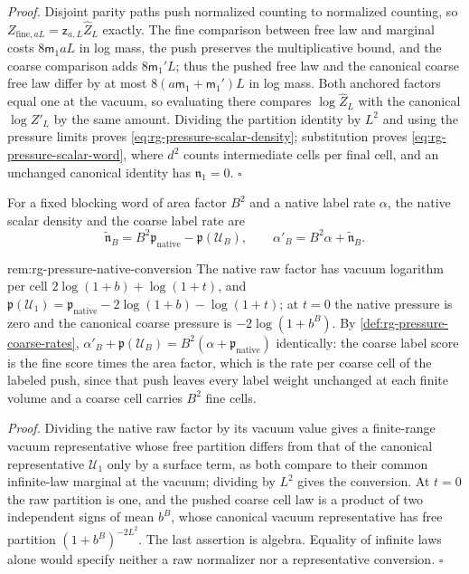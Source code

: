 \noindent\emph{Proof.}
Disjoint parity paths push normalized counting to normalized counting, so
$Z_{\mathrm{fine},aL}=\mathsf z_{a,L}\widehat Z_L$ exactly. The fine
comparison between free law and marginal costs $8\mathsf m_1aL$ in log mass,
the push preserves the multiplicative bound, and the coarse comparison adds
$8\mathsf m_1'L$; thus the pushed free law and the canonical coarse free law
differ by at most $8(a\mathsf m_1+\mathsf m_1')L$ in log mass. Both anchored
factors equal one at the vacuum, so evaluating there compares
$\log\widehat Z_L$ with the canonical $\log Z'_L$ by the same amount.
Dividing the partition identity by $L^2$ and using the pressure limits proves
\cref{eq:rg-pressure-scalar-density}; substitution proves
\cref{eq:rg-pressure-scalar-word}, where $d^2$ counts intermediate cells per
final cell, and an unchanged canonical identity has $\mathfrak n_1=0$. $\square$

For a fixed blocking word of area factor $B^2$ and a native label rate
$\alpha$, the native scalar density and the coarse label rate are
\begin{equation}
 \widetilde{\mathfrak n}_B=B^2\mathfrak p_{\mathrm{native}}
                            -\mathfrak p(\mathscr U_B),\qquad
 \alpha'_B=B^2\alpha+\widetilde{\mathfrak n}_B.
 \label{eq:rg-pressure-native-scalar}
\end{equation}

{rem:rg-pressure-native-conversion}
The native raw factor has vacuum logarithm per cell
$2\log(1+b)+\log(1+t)$, and
$\mathfrak p(\mathscr U_1)=\mathfrak p_{\mathrm{native}}-2\log(1+b)-\log(1+t)$; at
$t=0$ the native pressure is zero and the canonical coarse pressure is
$-2\log(1+b^B)$. By \cref{def:rg-pressure-coarse-rates},
$\alpha'_B+\mathfrak p(\mathscr U_B)=B^2(\alpha+\mathfrak p_{\mathrm{native}})$
identically: the coarse label score is the fine score times the area factor,
which is the rate per coarse cell of the labeled push, since that push leaves
every label weight unchanged at each finite volume and a coarse cell carries
$B^2$ fine cells. 

\noindent\emph{Proof.}
Dividing the native raw factor by its vacuum value gives a finite-range
vacuum representative whose free partition differs from that of the canonical
representative $\mathscr U_1$ only by a surface term, as both compare to their
common infinite-law marginal at the vacuum; dividing by $L^2$ gives the
conversion. At $t=0$ the raw partition is one, and the pushed coarse cell law
is a product of two independent signs of mean $b^B$, whose canonical vacuum
representative has free partition $(1+b^B)^{-2L^2}$. The last assertion is
algebra. Equality of infinite laws alone would specify neither a raw
normalizer nor a representative conversion. $\square$

